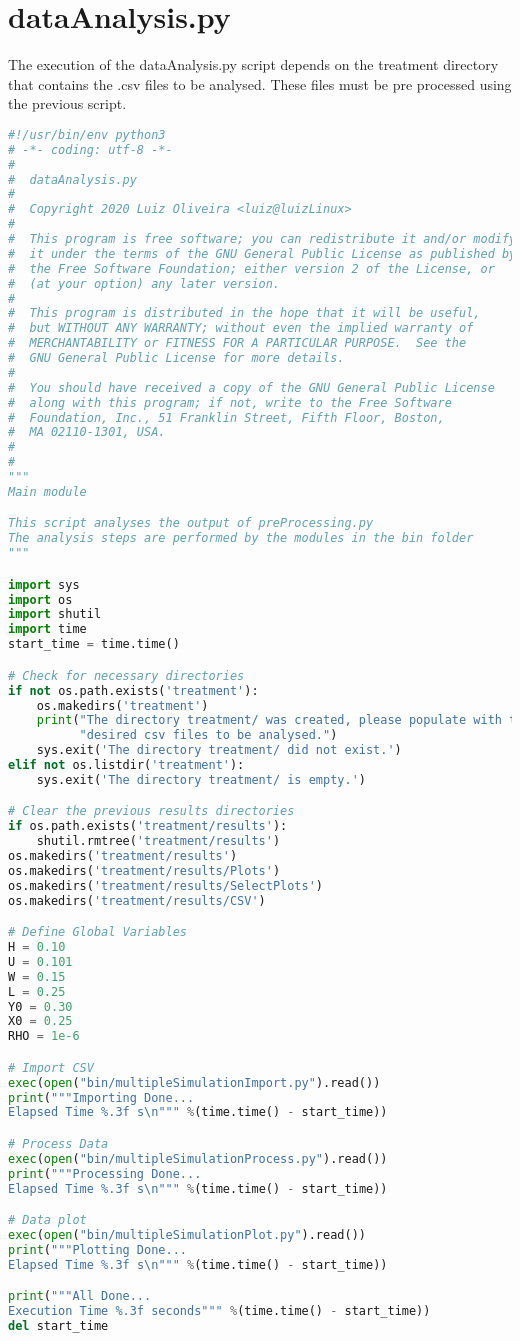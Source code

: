\section{dataAnalysis.py}
\noindent
The execution of the dataAnalysis.py script depends on the treatment directory that contains the .csv files to be analysed. These files must be pre processed using the previous script.
\begin{lstlisting}[language=python]
#!/usr/bin/env python3
# -*- coding: utf-8 -*-
#
#  dataAnalysis.py
#
#  Copyright 2020 Luiz Oliveira <luiz@luizLinux>
#
#  This program is free software; you can redistribute it and/or modify
#  it under the terms of the GNU General Public License as published by
#  the Free Software Foundation; either version 2 of the License, or
#  (at your option) any later version.
#
#  This program is distributed in the hope that it will be useful,
#  but WITHOUT ANY WARRANTY; without even the implied warranty of
#  MERCHANTABILITY or FITNESS FOR A PARTICULAR PURPOSE.  See the
#  GNU General Public License for more details.
#
#  You should have received a copy of the GNU General Public License
#  along with this program; if not, write to the Free Software
#  Foundation, Inc., 51 Franklin Street, Fifth Floor, Boston,
#  MA 02110-1301, USA.
#
#
"""
Main module

This script analyses the output of preProcessing.py
The analysis steps are performed by the modules in the bin folder
"""

import sys
import os
import shutil
import time
start_time = time.time()

# Check for necessary directories
if not os.path.exists('treatment'):
    os.makedirs('treatment')
    print("The directory treatment/ was created, please populate with the "
          "desired csv files to be analysed.")
    sys.exit('The directory treatment/ did not exist.')
elif not os.listdir('treatment'):
    sys.exit('The directory treatment/ is empty.')

# Clear the previous results directories
if os.path.exists('treatment/results'):
    shutil.rmtree('treatment/results')
os.makedirs('treatment/results')
os.makedirs('treatment/results/Plots')
os.makedirs('treatment/results/SelectPlots')
os.makedirs('treatment/results/CSV')

# Define Global Variables
H = 0.10
U = 0.101
W = 0.15
L = 0.25
Y0 = 0.30
X0 = 0.25
RHO = 1e-6

# Import CSV
exec(open("bin/multipleSimulationImport.py").read())
print("""Importing Done...
Elapsed Time %.3f s\n""" %(time.time() - start_time))

# Process Data
exec(open("bin/multipleSimulationProcess.py").read())
print("""Processing Done...
Elapsed Time %.3f s\n""" %(time.time() - start_time))

# Data plot
exec(open("bin/multipleSimulationPlot.py").read())
print("""Plotting Done...
Elapsed Time %.3f s\n""" %(time.time() - start_time))

print("""All Done...
Execution Time %.3f seconds""" %(time.time() - start_time))
del start_time

\end{lstlisting}
